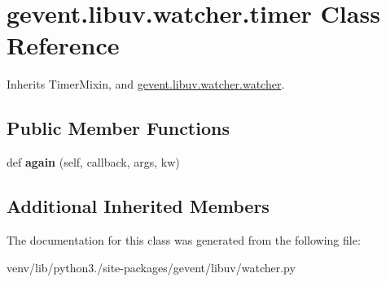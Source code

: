 \hypertarget{classgevent_1_1libuv_1_1watcher_1_1timer}{}\section{gevent.\+libuv.\+watcher.\+timer Class Reference}
\label{classgevent_1_1libuv_1_1watcher_1_1timer}


Inherits Timer\+Mixin, and \hyperlink{classgevent_1_1libuv_1_1watcher_1_1watcher}{gevent.\+libuv.\+watcher.\+watcher}.

\subsection*{Public Member Functions}
\begin{DoxyCompactItemize}
\item 
\mbox{\label{classgevent_1_1libuv_1_1watcher_1_1timer_a5063d97d8005270c99bdaeedaea73da6}} 
def {\bfseries again} (self, callback, args, kw)
\end{DoxyCompactItemize}
\subsection*{Additional Inherited Members}


The documentation for this class was generated from the following file\+:\begin{DoxyCompactItemize}
\item 
venv/lib/python3./site-\/packages/gevent/libuv/watcher.\+py\end{DoxyCompactItemize}
